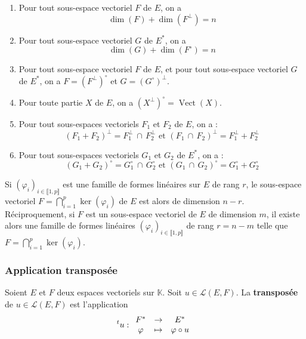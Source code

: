   \begin{corollary}
    \begin{enumerate}[label={\bfseries(\roman*)}]
      \item Pour tout sous-espace vectoriel $F$ de $E$, on a
      \[ \dim(F) + \dim(F^\perp) = n \]
      \item Pour tout sous-espace vectoriel $G$ de $E^*$, on a
      \[ \dim(G) + \dim(F^\circ) = n \]
      \item Pour tout sous-espace vectoriel $F$ de $E$, et pour tout sous-espace vectoriel $G$ de $E^*$, on a $F = (F^\perp)^\circ$ et $G = (G^\circ)^\perp$.
      \item Pour toute partie $X$ de $E$, on a $(X^\perp)^\circ = \operatorname{Vect}(X)$.
      \item Pour tout sous-espaces vectoriels $F_1$ et $F_2$ de $E$, on a :
      \[ (F_1 + F_2)^\perp = F_1^\perp \, \cap \, F_2^\perp \text{ et } (F_1 \, \cap \, F_2)^\perp = F_1^\perp + F_2^\perp \]
      \item Pour tout sous-espaces vectoriels $G_1$ et $G_2$ de $E^*$, on a :
      \[ (G_1 + G_2)^\circ = G_1^\circ \, \cap \, G_2^\circ \text{ et } (G_1 \, \cap \, G_2)^\circ = G_1^\circ + G_2^\circ \]
    \end{enumerate}
  \end{corollary}

  \begin{corollary}
    Si $(\varphi_i)_{i \in \llbracket 1, p \rrbracket}$ est une famille de formes linéaires sur $E$ de rang $r$, le sous-espace vectoriel $F = \bigcap_{i=1}^p \ker(\varphi_i)$ de $E$ est alors de dimension $n-r$. Réciproquement, si $F$ est un sous-espace vectoriel de $E$ de dimension $m$, il existe alors une famille de formes linéaires $(\varphi_i)_{i \in \llbracket 1, p \rrbracket}$ de rang $r = n-m$ telle que $F = \bigcap_{i=1}^p \ker(\varphi_i)$.
  \end{corollary}

  \subsubsection{Application transposée}


  \begin{definition}
    Soient $E$ et $F$ deux espaces vectoriels sur $\mathbb{K}$. Soit $u \in \mathcal{L}(E,F)$. La \textbf{transposée} de $u \in \mathcal{L}(E,F)$ est l'application
    \[
      \mathstrut ^t u :
      \begin{array}{ccc}
        F^* &\rightarrow& E^* \\
        \varphi &\mapsto& \varphi \circ u
      \end{array}
    \]
  \end{definition}

